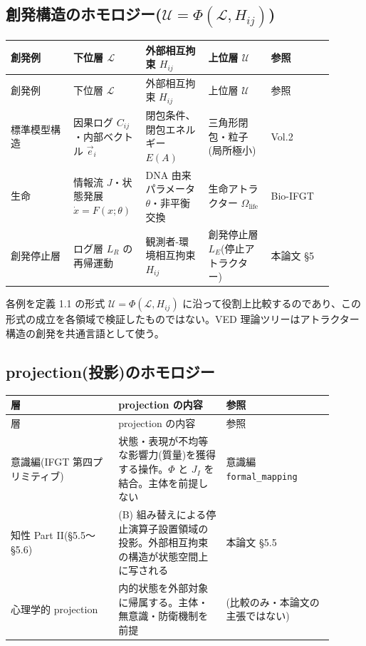 \bigskip


\subsection{創発構造のホモロジー($\mathcal{U} = \Phi(\mathcal{L}, H_{ij})$)}


\begin{longtable}{@{}p{0.18\linewidth}p{0.18\linewidth}p{0.18\linewidth}p{0.18\linewidth}p{0.18\linewidth}@{}}
\toprule
創発例 & 下位層 $\mathcal{L}$ & 外部相互拘束 $H_{ij}$ & 上位層 $\mathcal{U}$ & 参照 \\
\midrule
\endfirsthead
\toprule
創発例 & 下位層 $\mathcal{L}$ & 外部相互拘束 $H_{ij}$ & 上位層 $\mathcal{U}$ & 参照 \\
\midrule
\endhead
標準模型構造 & 因果ログ $C_{ij}$・内部ベクトル $\vec{e}_i$ & 閉包条件、閉包エネルギー $E(A)$ & 三角形閉包・粒子(局所極小) & Vol.2 \\
生命 & 情報流 $J$・状態発展 $\dot{x}=F(x;\theta)$ & DNA 由来パラメータ $\theta$・非平衡交換 & 生命アトラクター $\Omega_{\text{life}}$ & Bio-IFGT \\
創発停止層 & ログ層 $L_R$ の再帰運動 & 観測者-環境相互拘束 $H_{ij}$ & 創発停止層 $L_E$(停止アトラクター) & 本論文 \S{}5 \\
\bottomrule
\end{longtable}


各例を定義 1.1 の形式 $\mathcal{U} = \Phi(\mathcal{L}, H_{ij})$ に沿って役割上比較するのであり、この形式の成立を各領域で検証したものではない。VED 理論ツリーはアトラクター構造の創発を共通言語として使う。

\bigskip


\subsection{projection(投影)のホモロジー}


\begin{longtable}{@{}p{0.30\linewidth}p{0.30\linewidth}p{0.30\linewidth}@{}}
\toprule
層 & projection の内容 & 参照 \\
\midrule
\endfirsthead
\toprule
層 & projection の内容 & 参照 \\
\midrule
\endhead
意識編(IFGT 第四プリミティブ) & 状態・表現が不均等な影響力(質量)を獲得する操作。$\Phi$ と $J_I$ を結合。主体を前提しない & 意識編 \texttt{formal\_mapping} \\
知性 Part II(\S{}5.5〜\S{}5.6) & (B) 組み替えによる停止演算子設置領域の投影。外部相互拘束の構造が状態空間上に写される & 本論文 \S{}5.5 \\
心理学的 projection & 内的状態を外部対象に帰属する。主体・無意識・防衛機制を前提 & (比較のみ・本論文の主張ではない) \\
\bottomrule
\end{longtable}


